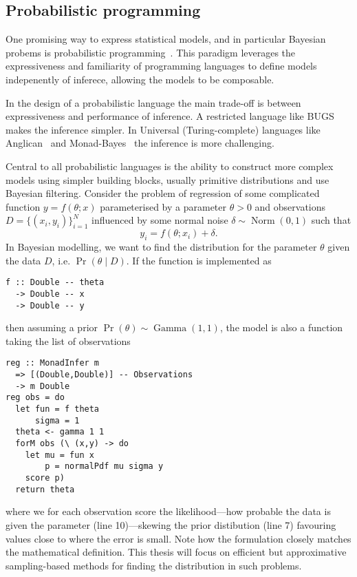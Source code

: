 \subsection{Probabilistic programming}
\label{sec:pprog}

One promising way to express statistical models, and in particular Bayesian probems is probabilistic programming~\cite{dippl}. This paradigm leverages the expressiveness and familiarity of programming
languages  to define models indepenently of inferece, allowing the models to be composable.

In the design of a probabilistic language the main trade-off is between
expressiveness and performance of inference. A restricted language like
BUGS~\cite{bugs} makes the inference simpler. In Universal
(Turing-complete) languages like Anglican~\cite{anglican} and
Monad-Bayes~\cite{mbayes} the inference is more challenging.

Central to all probabilistic languages is the ability to construct more
complex models using simpler building blocks, usually primitive distributions
and use Bayesian filtering. Consider the problem of regression of some complicated function $y = f(\theta;x)$ parameterised by a parameter $\theta > 0$ and observations $D = \{ (x_i,y_i) \}_{i=1}^N$ influenced by some normal noise $\delta \sim \operatorname{Norm}(0,1)$ such that
\begin{equation}
   y_i = f(\theta;x_i) + \delta .
\end{equation}
In Bayesian modelling, we want to find the distribution for the parameter $\theta$ given the data $D$, i.e. $\Pr(\theta \mid D)$. If the function is implemented as
\begin{verbatim}
f :: Double -- theta
  -> Double -- x
  -> Double -- y
\end{verbatim}
then assuming a prior $\Pr(\theta) \sim \operatorname{Gamma}(1,1)$, the model is also a function taking the list of observations
\begin{verbatim}
reg :: MonadInfer m
  => [(Double,Double)] -- Observations
  -> m Double
reg obs = do
  let fun = f theta
      sigma = 1
  theta <- gamma 1 1
  forM obs (\ (x,y) -> do
    let mu = fun x
        p = normalPdf mu sigma y
    score p)
  return theta
\end{verbatim}
where we for each observation score the likelihood---how probable the data is given the parameter (line 10)---skewing the prior distibution (line 7) favouring values close to where the error is small. Note how the formulation closely matches the mathematical definition. This thesis will focus on efficient but approximative sampling-based
methods for finding the distribution in such problems.

